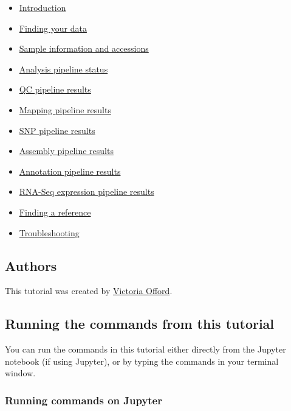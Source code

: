 \documentclass[11pt]{article}
\providecommand{\tightlist}{%
      \setlength{\itemsep}{0pt}\setlength{\parskip}{0pt}}
\begin{document}
\begin{itemize}
\tightlist
\item
  \href{introduction.ipynb}{Introduction}
\item
  \href{finding-your-data.ipynb}{Finding your data}
\item
  \href{information-and-accessions.ipynb}{Sample information and
  accessions}
\item
  \href{pipeline-status.ipynb}{Analysis pipeline status}
\item
  \href{qc-pipeline-results.ipynb}{QC pipeline results}
\item
  \href{mapping-pipeline-results.ipynb}{Mapping pipeline results}
\item
  \href{snp-pipeline-results.ipynb}{SNP pipeline results}
\item
  \href{assembly-pipeline-results.ipynb}{Assembly pipeline results}
\item
  \href{annotation-pipeline-results.ipynb}{Annotation pipeline results}
\item
  \href{rnaseq-pipeline-results.ipynb}{RNA-Seq expression pipeline
  results}
\item
  \href{finding-a-reference.ipynb}{Finding a reference}
\item
  \href{troubleshooting.ipynb}{Troubleshooting}
\end{itemize}

    \hypertarget{authors}{%
\subsection{Authors}\label{authors}}

This tutorial was created by \href{https://github.com/vaofford}{Victoria
Offord}.

    \hypertarget{running-the-commands-from-this-tutorial}{%
\subsection{Running the commands from this
tutorial}\label{running-the-commands-from-this-tutorial}}

You can run the commands in this tutorial either directly from the
Jupyter notebook (if using Jupyter), or by typing the commands in your
terminal window.

\hypertarget{running-commands-on-jupyter}{%
\subsubsection{Running commands on
Jupyter}\label{running-commands-on-jupyter}}
\end{document}
